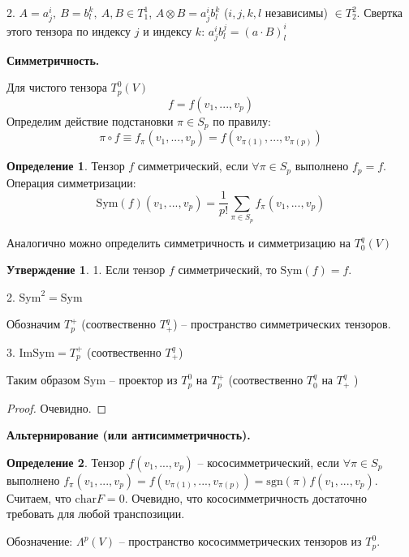 \documentclass[a4paper, 12pt]{article}
\newcommand\tab[1][.5cm]{\hspace*{#1}}
\theoremstyle{definition}
\newtheorem*{definition}{Определение}
\newtheorem*{subtheorem}{Утверждение}
\begin{document}
    2. $A = a_j^i,\ B = b_l^k,\ A,B \in T_1^1$, $A \otimes B = a_j^ib_l^k$ ($i,j,k,l$ независимы) $\in T_2^2$. Свертка этого тензора по индексу $j$ и индексу $k$: $a_j^i b_l^j = (a\cdot B)_l^i$
    \begin{center}
        \textbf{Симметричность.} 
    \end{center}
    Для чистого тензора $T_p^0(V)$
    $$f = f(v_1,...,v_p)$$
    Определим действие подстановки $\pi \in S_p$ по правилу:
    $$\pi \circ f \equiv f_\pi(v_1,...,v_p) = f(v_{\pi(1)},...,v_{\pi(p)})$$     
    \begin{definition}
        Тензор $f$ симметрический, если $\forall \pi \in S_p$ выполнено $f_p = f$.\\ Операция симметризации: 
        $$\text{Sym}(f)(v_1,...,v_p) = \frac{1}{p!} \sum\limits_{\pi \in S_p} f_\pi(v_1,...,v_p)$$
    \end{definition}
    Аналогично можно определить симметричность и симметризацию на $T_0^q(V)$ 
    \begin{subtheorem}\tab[1cm]

        1. Если тензор $f$ симметрический, то $\text{Sym}(f) = f$.

        2. $\text{Sym}^2 = \text{Sym}$

        Обозначим $T_p^+$ (соотвественно $T_+^q$) -- пространство симметрических тензоров.

        3. $\text{ImSym} = T_p^+$ (соотвественно $T_+^q$)
        
        Таким образом $\text{Sym}$ -- проектор из $T_p^0$ на $T_p^+$ (соотвественно $T_0^q$ на $T_+^q$ )   
    \end{subtheorem}
    \begin{proof}
        Очевидно.
    \end{proof}
    \begin{center}
        \textbf{Альтернирование (или антисимметричность).} 
    \end{center}
    \begin{definition}
        Тензор $f(v_1,...,v_p)$ -- кососимметрический, если $\forall \pi \in S_p$ выполнено $f_\pi(v_1,...,v_p) = f(v_{\pi(1)},...,v_{\pi(p)}) = \text{sgn}(\pi)f(v_1,...,v_p)$.\\ Считаем, что $\text{char}F = 0$. Очевидно, что кососимметричность достаточно требовать для любой транспозиции.
    \end{definition}
    Обозначение: $\Lambda^p(V)$ -- пространство кососимметрических тензоров из $T_p^0$.\\
\end{document}
